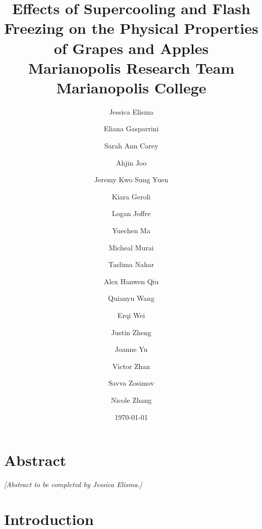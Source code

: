 \documentclass[12pt, a4paper]{article}
\title{\textbf{Effects of Supercooling and Flash Freezing on the Physical
Properties of Grapes and Apples}\\[1em]
\large Marianopolis Research Team\\
Marianopolis College}
\author{
  Jessica Elisma \and Eliana Gasparrini \and Sarah Ann Carey \and
  Ahjin Joo \and Jeremy Kwo Sung Yuen \and Kiara Geroli \and
  Logan Joffre \and Yuechen Ma \and Micheal Murai \and
  Taslima Nahar \and Alex Hanwen Qiu \and Quianyu Wang \and
  Erqi Wei \and Justin Zheng \and Joanne Yu \and
  Victor Zhan \and Savva Zosimov \and Nicole Zhang
}
\date{\today}
\begin{document}
\maketitle

\section*{Abstract}


\textit{[Abstract to be completed by Jessica Elisma.]}

\clearpage\twocolumn

\section{Introduction}

\end{document}
